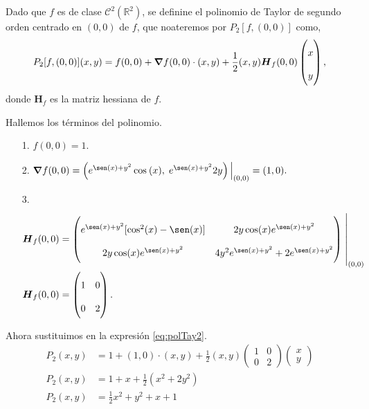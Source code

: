 \begin{solution}
    Dado que $f$ es de clase  $\mathcal{C}^2(\mathbb{R}^2)$,  se definine  el polinomio de Taylor de segundo orden centrado en $(0,0)$ de $f$, que noateremos por $P_2[f,(0,0)]$ como,
    \begin{equation}
        P_2[f,(0,0)](x,y)=f(0,0)+\grad f(0,0)\cdot(x,y)+\frac{1}{2}(x,y)\boldsymbol{H}_f(0,0)\begin{pmatrix}x\\y\end{pmatrix}, \label{eq:polTay2}
    \end{equation}
    donde $\boldsymbol{H}_f$ es la matriz hessiana de $f$.

    Hallemos los  términos del polinomio.

    \begin{itemize}
        \item[1.] $f(0,0)=1.$
        \item[2.] $ \grad f(0,0) = \left(e^{\sen(x)+y^2}\cos\:(x),\;e^{\sen(x)+y^2}2y\right)\Big\rvert_{(0,0)}=(1,0).$
        \item[3.] \begin{align*}
                  \boldsymbol{H}_f(0,0) & =\left(
                  \renewcommand{\arraystretch}{2} %
                  \begin{matrix}
                      e^{\sen(x)+y^2}[\cos^2(x)-\sen(x)] & 2y\cos(x)e^{\sen(x)+y^2}             \\
                      2y\cos(x)e^{\sen(x)+y^2}           & 4y^2e^{\sen(x)+y^2}+2e^{\sen(x)+y^2}
                  \end{matrix}\right)\left.\rule{0pt}{1.1cm}\right\rvert_{(0,0)} \\
                  \boldsymbol{H}_f(0,0) & =\left(\begin{matrix}
                                                         1 & 0 \\0&2
                                                     \end{matrix}\right).
              \end{align*}
    \end{itemize}

    Ahora sustituimos en la expresión \eqref{eq:polTay2}.
    \begin{align*}
        P_2(x,y) & =1+(1,0)\cdot(x,y)+\frac{1}{2}(x,y)\left(\begin{matrix}1&0\\0&2\end{matrix}\right)\begin{pmatrix}x\\y\end{pmatrix} \\
        P_2(x,y) & =1+x+\frac{1}{2}(x^2+2y^2)                                                                                         \\
        P_2(x,y) & =\frac{1}{2}x^2+y^2+x+1
    \end{align*}


\end{solution}
